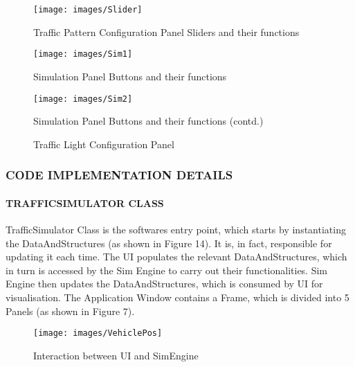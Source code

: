 \documentclass[11pt,a4paper]{article}
\begin{document}
	\begin{figure}[bp!]
		\texttt{[image: images/Slider]}
		\caption{Traffic Pattern Configuration Panel Sliders and their functions}
		\centering
	\end{figure}
	
	\begin{figure}[bp!]
		\texttt{[image: images/Sim1]}
		\caption{Simulation Panel Buttons and their functions}
		\centering
	\end{figure}
		
	\begin{figure}[h!]
		\texttt{[image: images/Sim2]}
		\caption{Simulation Panel Buttons and their functions (contd.)}
		\centering
	\end{figure}
	
	\begin{figure}[h!]
		\setlength\fboxsep{0pt}
		\setlength\fboxrule{0.5pt}
		\caption{Traffic Light Configuration Panel}
		\centering
	\end{figure}
 	
 \subsubsection{CODE IMPLEMENTATION DETAILS}	
 	\paragraph{TRAFFIC\textunderscore SIMULATOR CLASS}
	Traffic\textunderscore Simulator Class is the software\textquotesingle s entry
	point, which starts by instantiating the DataAndStructures (as
	shown in Figure 14). It is, in fact, responsible for updating it
	each time. The UI populates the relevant DataAndStructures, which in turn is
	accessed by the Sim Engine to carry out their functionalities. Sim
	Engine then updates the DataAndStructures, which is consumed by UI
	for visualisation. The Application Window contains a Frame, which is divided into 5
	Panels (as shown in Figure 7).
		
	\begin{figure}[h!]
		\texttt{[image: images/VehiclePos]}
		\caption{Interaction between UI and SimEngine}
		\centering
	\end{figure}
	
\end{document}
